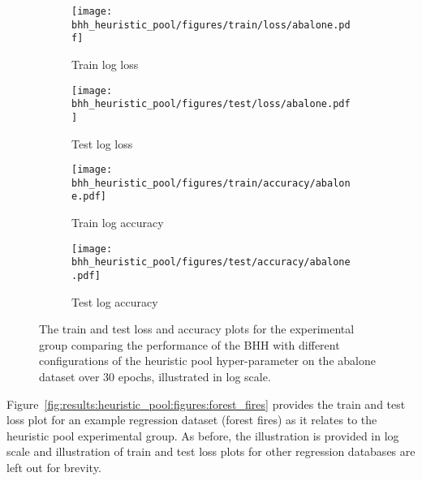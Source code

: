 \begin{figure}[htbp]
	\begin{subfigure}{0.5\textwidth}
		\centering
		\texttt{[image: bhh\_heuristic\_pool/figures/train/loss/abalone.pdf]}
		\caption{Train log loss}
		\label{fig:results:heuristic_pool:figures:loss:train:abalone}
	\end{subfigure}
	\begin{subfigure}{0.5\textwidth}
		\centering
		\texttt{[image: bhh\_heuristic\_pool/figures/test/loss/abalone.pdf]}
		\caption{Test log loss}
		\label{fig:results:heuristic_pool:figures:loss:test:abalone}
	\end{subfigure}
	\par\bigskip
	\begin{subfigure}{0.5\textwidth}
		\centering
		\texttt{[image: bhh\_heuristic\_pool/figures/train/accuracy/abalone.pdf]}
		\caption{Train log accuracy}
		\label{fig:results:heuristic_pool:figures:accuracy:train:abalone}
	\end{subfigure}
	\begin{subfigure}{0.5\textwidth}
		\centering
		\texttt{[image: bhh\_heuristic\_pool/figures/test/accuracy/abalone.pdf]}
		\caption{Test log accuracy}
		\label{fig:results:heuristic_pool:figures:accuracy:test:abalone}
	\end{subfigure}
	\par\bigskip
	\caption{The train and test loss and accuracy plots for the experimental group comparing the performance of the \acs{BHH} with different configurations of the heuristic pool hyper-parameter on the abalone dataset over 30 epochs, illustrated in log scale.}
	\label{fig:results:heuristic_pool:figures:abalone}
\end{figure}

Figure~\ref{fig:results:heuristic_pool:figures:forest_fires} provides the train and test loss plot for an example regression dataset (forest fires) as it relates to the heuristic pool experimental group. As before, the illustration is provided in log scale and illustration of train and test loss plots for other regression databases are left out for brevity.

